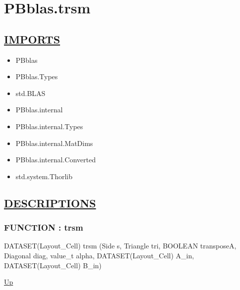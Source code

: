 \chapter*{PBblas.trsm}
\hypertarget{ecldoc:toc:PBblas.trsm}{}

\section*{\underline{IMPORTS}}
\begin{itemize}
\item PBblas
\item PBblas.Types
\item std.BLAS
\item PBblas.internal
\item PBblas.internal.Types
\item PBblas.internal.MatDims
\item PBblas.internal.Converted
\item std.system.Thorlib
\end{itemize}

\section*{\underline{DESCRIPTIONS}}
\subsection*{FUNCTION : trsm}
\hypertarget{ecldoc:pbblas.trsm}{}
\begin{minipage}[t]{\textwidth}
\begin{flushleft}
DATASET(Layout\_Cell) trsm (Side s, Triangle tri, BOOLEAN transposeA, Diagonal diag, value\_t alpha, DATASET(Layout\_Cell) A\_in, DATASET(Layout\_Cell) B\_in)
\end{flushleft}
\end{minipage}
\hyperlink{ecldoc:toc:PBblas}{Up}

